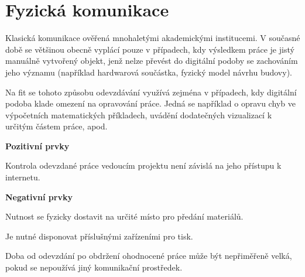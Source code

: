 

\section{Fyzická komunikace}

Klasická komunikace ověřená mnohaletými akademickými institucemi. V současné době se většinou obecně vyplácí pouze v případech, kdy výsledkem práce je jistý manuálně vytvořený objekt, jenž nelze převést do digitální podoby se zachováním jeho významu (například hardwarová součástka, fyzický model návrhu budovy).

Na \gls{fit} se tohoto způsobu odevzdávání využívá zejména v případech, kdy digitální podoba klade omezení na opravování práce. Jedná se například o opravu chyb ve výpočetních matematických příkladech, uvádění dodatečných vizualizací k určitým částem práce, apod.

\textbf{Pozitivní prvky}
\begin{ul}
   \item Kontrola odevzdané práce vedoucím projektu není závislá na jeho přístupu k internetu.
\end{ul}

\textbf{Negativní prvky}
\begin{ul}
   \item Nutnost se fyzicky dostavit na určité místo pro předání materiálů.
   \item Je nutné disponovat příslušnými zařízeními pro tisk.
   \item Doba od odevzdání po obdržení ohodnocené práce může být nepřiměřeně velká, pokud se nepoužívá jiný komunikační prostředek.
\end{ul}
